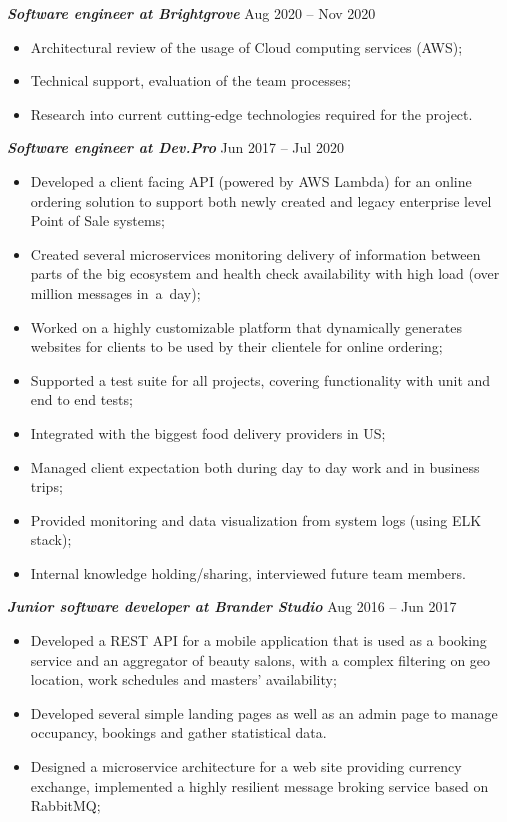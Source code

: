 \documentclass[margin, 10pt]{res} %
\begin{document}
\begin{resume}
{\sl \bf Software engineer at Brightgrove } \hfill Aug 2020 -- Nov 2020
\vspace{3px}
\begin{itemize}
 \item Architectural review of the usage of Cloud computing services (AWS);
 \item Technical support, evaluation of the team processes;
 \item Research into current cutting-edge technologies required for the project.
\end{itemize}

{\sl \bf Software engineer at Dev.Pro } \hfill Jun 2017 -- Jul 2020
\vspace{3px}
 \begin{itemize}
 \item Developed a client facing API (powered by AWS Lambda) for an online ordering solution to support both newly created and legacy enterprise level Point of Sale systems;
 \item Created several microservices monitoring delivery of information between parts of the big ecosystem and health check availability with high load (over million messages in~a~day);
 \item Worked on a highly customizable platform that dynamically generates websites for clients to be used by their clientele for online ordering;
 \item Supported a test suite for all projects, covering functionality with unit and end to end tests;
 \item Integrated with the biggest food delivery providers in US;
 \item Managed client expectation both during day to day work and in business trips;
 \item Provided monitoring and data visualization from system logs (using ELK stack);
 \item Internal knowledge holding/sharing, interviewed future team members.
\end{itemize}

{\sl \bf Junior software developer at Brander Studio} \hfill Aug 2016 -- Jun 2017
\vspace{3px}
\begin{itemize}
 \item Developed a REST API for a mobile application that is used as a booking service and an aggregator of beauty salons, with a complex filtering on geo location, work schedules and masters' availability;
 \item Developed several simple landing pages as well as an admin page to manage occupancy, bookings and gather statistical data.
 \item Designed a microservice architecture for a web site providing currency exchange, implemented a highly resilient message broking service based on RabbitMQ;
\end{itemize}


\end{resume}
\end{document}
